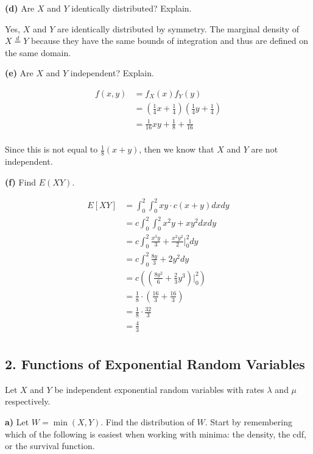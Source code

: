 \documentclass[11pt]{article}
\begin{document}
\textbf{(d)} Are \(X\) and \(Y\) identically distributed? Explain.

Yes, $X$ and $Y$ are identically distributed by symmetry. The marginal density of $ X \stackrel{d}{=} Y $ because they have the same bounds of integration and thus are defined on the same domain. 

\textbf{(e)} Are \(X\) and \(Y\) independent? Explain.

\begin{align*}
	f(x,y) &= f_{X}(x) f_{Y}(y) \\
	&= (\frac{1}{4}x + \frac{1}{4})(\frac{1}{4}y + \frac{1}{4}) \\
	&= \frac{1}{16}xy + \frac{1}{8} + \frac{1}{16} \\
\end{align*}
 
Since this is not equal to $ \frac{1}{8}(x+y) $, then we know that $ X $ and $ Y $ are not independent. 

\textbf{(f)} Find \(E(XY)\).

\begin{align*}
	E[XY] &= \int_{0}^{2}\int_{0}^{2} xy \cdot c(x+y) dxdy	\\
	&= c \int_{0}^{2}\int_{0}^{2} x^{2}y + xy^{2} dxdy \\
	&= c \int_{0}^{2} \frac{x^{3}y}{3} + \frac{x^{2}y^{2}}{2} \vert _{0}^{2} dy \\
	&= c \int_{0}^{2} \frac{8y}{3} + 2y^{2} dy \\
	&= c ( (\frac{8y^{2}}{6} + \frac{2}{3}y^{3}) \vert _{0}^{2} ) \\
	&= \frac{1}{8} \cdot (\frac{16}{3} + \frac{16}{3}) \\
	&= \frac{1}{8} \cdot \frac{32}{3} \\
	&= \frac{4}{3} \\
\end{align*}
    \newpage

    \subsection{2. Functions of Exponential Random
Variables}\label{functions-of-exponential-random-variables}

Let \(X\) and \(Y\) be independent exponential random variables with
rates \(\lambda\) and \(\mu\) respectively.

\textbf{a)} Let \(W = \min(X, Y)\). Find the distribution of \(W\).
Start by remembering which of the following is easiest when working with
minima: the density, the cdf, or the survival function.
\end{document}
